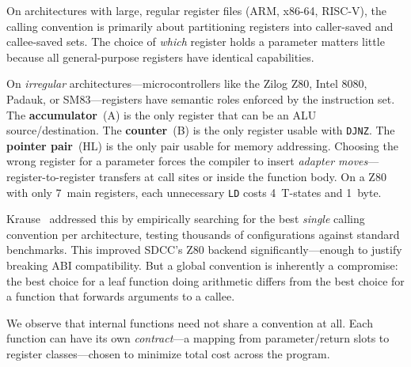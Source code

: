 \documentclass[sigplan,screen,nonacm]{acmart}
\begin{document}
On architectures with large, regular register files (ARM, x86-64, RISC-V),
the calling convention is primarily about partitioning registers into
caller-saved and callee-saved sets.  The choice of \emph{which} register
holds a parameter matters little because all general-purpose registers have
identical capabilities.

On \emph{irregular} architectures---microcontrollers like the Zilog Z80,
Intel 8080, Padauk, or SM83---registers have semantic roles enforced by the
instruction set.  The \textbf{accumulator}~(A) is the only register that can
be an ALU source/destination.  The \textbf{counter}~(B) is the only register
usable with \texttt{DJNZ}.  The \textbf{pointer pair}~(HL) is the only pair
usable for memory addressing.  Choosing the wrong register for a parameter
forces the compiler to insert \emph{adapter moves}---register-to-register
transfers at call sites or inside the function body.  On a Z80 with only
7~main registers, each unnecessary \texttt{LD} costs 4~T-states and 1~byte.

Krause~\cite{krause2022} addressed this by empirically searching for the
best \emph{single} calling convention per architecture, testing thousands of
configurations against standard benchmarks.  This improved SDCC's Z80
backend significantly---enough to justify breaking ABI compatibility.  But a
global convention is inherently a compromise: the best choice for a leaf
function doing arithmetic differs from the best choice for a function that
forwards arguments to a callee.

We observe that internal functions need not share a convention at all.  Each
function can have its own \emph{contract}---a mapping from parameter/return
slots to register classes---chosen to minimize total cost across the
program.
\end{document}
